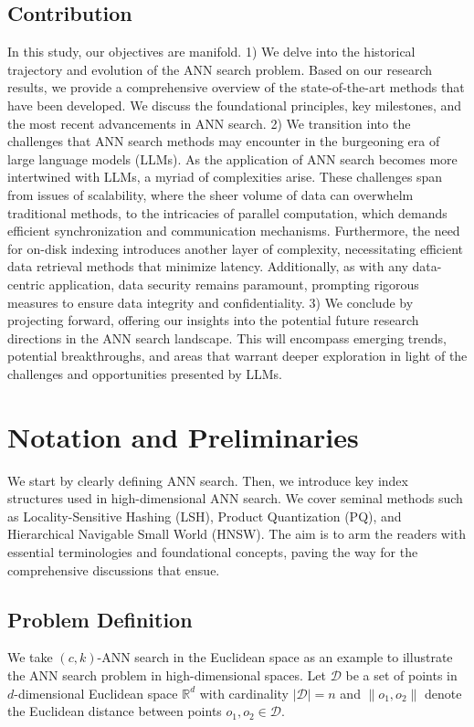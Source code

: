 \documentclass[11pt]{article}
\begin{document}
\subsection{Contribution}

In this study, our objectives are manifold. 1) We delve into the historical trajectory and evolution of the ANN search problem. Based on our research results, we provide a comprehensive overview of the state-of-the-art methods that have been developed. We discuss the foundational principles, key milestones, and the most recent advancements in ANN search. 2) We transition into the challenges that ANN search methods may encounter in the burgeoning era of large language models (LLMs). As the application of ANN search becomes more intertwined with LLMs, a myriad of complexities arise. These challenges span from issues of scalability, where the sheer volume of data can overwhelm traditional methods, to the intricacies of parallel computation, which demands efficient synchronization and communication mechanisms. Furthermore, the need for on-disk indexing introduces another layer of complexity, necessitating efficient data retrieval methods that minimize latency. Additionally, as with any data-centric application, data security remains paramount, prompting rigorous measures to ensure data integrity and confidentiality. 3) We conclude by projecting forward, offering our insights into the potential future research directions in the ANN search landscape. This will encompass emerging trends, potential breakthroughs, and areas that warrant deeper exploration in light of the challenges and opportunities presented by LLMs.

\section{Notation and Preliminaries}
\label{bolong_sec:preliminaries}

We start by clearly defining ANN search. Then, we introduce key index structures used in high-dimensional ANN search. We cover seminal methods such as Locality-Sensitive Hashing (LSH), Product Quantization (PQ), and Hierarchical Navigable Small World (HNSW). The aim is to arm the readers with essential terminologies and foundational concepts, paving the way for the comprehensive discussions that ensue.

\subsection{Problem Definition}
We take $(c,k)$-ANN search in the Euclidean space as an example to illustrate the ANN search problem in high-dimensional spaces. 
Let $\mathcal{D}$ be a set of points in $d$-dimensional Euclidean space $\mathbb{R}^d$ with cardinality $|\mathcal{D}|=n$ and $\|o_1,o_2\|$ denote the Euclidean distance between points $o_1, o_2 \in \mathcal{D}$.
\end{document}
